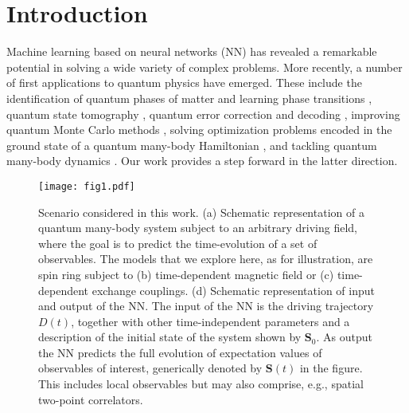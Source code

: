\documentclass[a4paper,aps,amsmath,amssymb,twocolumn,longbibliography,,accepted=2022-05-17]{quantumarticle}
\begin{document}
\section{Introduction\label{sec:introduction}}
Machine learning based on neural networks (NN) \cite{lecun2015deep,goodfellow2016deep} has revealed a remarkable potential in solving a wide variety of complex problems. More recently, a number of first applications to quantum physics have emerged. These include the identification of quantum phases of matter and learning phase transitions \cite{PhysRevB.94.195105, carrasquilla2017machine,van2017learning, wetzel2017unsupervised, beach2018machine}, quantum state tomography \cite{torlai2018neural,Prx}, quantum error correction and decoding \cite{PhysRevLett.119.030501,PhysRevX.8.031084}, improving quantum Monte Carlo methods \cite{PhysRevResearch.2.012039}, solving optimization problems encoded in the ground state of a quantum many-body Hamiltonian \cite{ mills2020controlled}, and tackling quantum many-body dynamics \cite{carleo2017solving,gao2017efficient, schmitt2019quantum, mohseni2021deep}. Our work provides a step forward in the latter direction.

\begin{figure}[h!]
	\centering
	\texttt{[image: fig1.pdf]}
	\caption{Scenario considered in this work.
		(a) Schematic representation of a quantum many-body system subject to an arbitrary driving field, where the goal is to predict the time-evolution of a set of observables. The models that we explore here, as for illustration, are spin ring subject to
		(b) time-dependent magnetic field or
		(c) time-dependent exchange couplings.
		(d) Schematic representation of input and output of the NN. The input of the NN is the driving trajectory $D(t)$, together with other time-independent parameters and a description of the initial state of the system shown by  $\boldsymbol{S}_0$. As output the NN predicts the full evolution of expectation values of observables of interest, generically denoted by $\boldsymbol{S}(t)$ in the figure. This includes local observables but may also comprise, e.g., spatial two-point correlators.
	}
	\label{fig1}
\end{figure}
\end{document}
